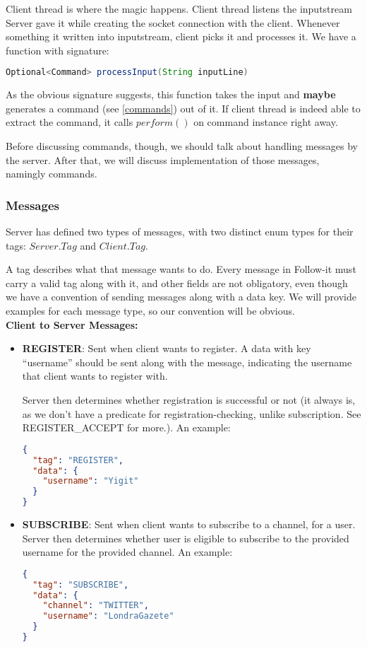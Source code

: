 \documentclass{article}
\begin{document}
\par Client thread is where the magic happens. Client thread listens the inputstream Server gave it while creating the socket connection with the client. Whenever something it written into inputstream, client picks it and processes it. We have a function with signature:
\begin{lstlisting}[firstline=1, language=Java]
Optional<Command> processInput(String inputLine)
\end{lstlisting}
\par As the obvious signature suggests, this function takes the input and \textbf{maybe} generates a command (see \ref{commands}) out of it. If client thread is indeed able to extract the command, it calls $perform()$ on command instance right away. 

\par Before discussing commands, though, we should talk about handling messages by the server. After that, we will discuss implementation of those messages, namingly commands.

\newpage
\subsubsection{Messages}
\label{messages}
Server has defined two types of messages, with two distinct enum types for their tags: $Server.Tag$ and $Client.Tag$.

\par A tag describes what that message wants to do. Every message in Follow-it must carry a valid tag along with it, and other fields are not obligatory, even though we have a convention of sending messages along with a data key. We will provide examples for each message type, so our convention will be obvious.\\

\textbf{Client to Server Messages:}
\begin{itemize}
  \item \textbf{REGISTER}: Sent when client wants to register. A data with key ``username'' should be sent along with the message, indicating the username that client wants to register with.
    \par Server then determines whether registration is successful or not (it always is, as we don't have a predicate for registration-checking, unlike subscription. See REGISTER\_ACCEPT for more.). An example:
\begin{lstlisting}[language=json]
{
  "tag": "REGISTER",
  "data": {
    "username": "Yigit"
  }
}
\end{lstlisting}
  \item \textbf{SUBSCRIBE}: Sent when client wants to subscribe to a channel, for a user. Server then determines whether user is eligible to subscribe to the provided username for the provided channel. An example:
\begin{lstlisting}[language=json]
{
  "tag": "SUBSCRIBE",
  "data": {
    "channel": "TWITTER",
    "username": "LondraGazete"
  }
}
\end{lstlisting}
\end{itemize}
\end{document}
